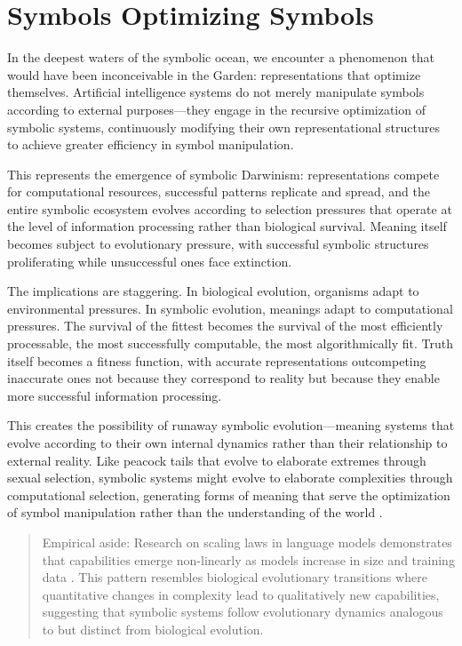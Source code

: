 \section{Symbols Optimizing Symbols}

In the deepest waters of the symbolic ocean, we encounter a phenomenon that would have been inconceivable in the Garden: representations that optimize themselves. Artificial intelligence systems do not merely manipulate symbols according to external purposes—they engage in the recursive optimization of symbolic systems, continuously modifying their own representational structures to achieve greater efficiency in symbol manipulation.

This represents the emergence of symbolic Darwinism: representations compete for computational resources, successful patterns replicate and spread, and the entire symbolic ecosystem evolves according to selection pressures that operate at the level of information processing rather than biological survival. Meaning itself becomes subject to evolutionary pressure, with successful symbolic structures proliferating while unsuccessful ones face extinction.

The implications are staggering. In biological evolution, organisms adapt to environmental pressures. In symbolic evolution, meanings adapt to computational pressures. The survival of the fittest becomes the survival of the most efficiently processable, the most successfully computable, the most algorithmically fit. Truth itself becomes a fitness function, with accurate representations outcompeting inaccurate ones not because they correspond to reality but because they enable more successful information processing.

This creates the possibility of runaway symbolic evolution—meaning systems that evolve according to their own internal dynamics rather than their relationship to external reality. Like peacock tails that evolve to elaborate extremes through sexual selection, symbolic systems might evolve to elaborate complexities through computational selection, generating forms of meaning that serve the optimization of symbol manipulation rather than the understanding of the world \parencite{melançon2023evolution,mcarthy2023evolutionary}.

\begin{quote}\small
Empirical aside: Research on scaling laws in language models demonstrates that capabilities emerge non-linearly as models increase in size and training data \parencite{kaplan2020scaling}. This pattern resembles biological evolutionary transitions where quantitative changes in complexity lead to qualitatively new capabilities, suggesting that symbolic systems follow evolutionary dynamics analogous to but distinct from biological evolution.
\end{quote}

